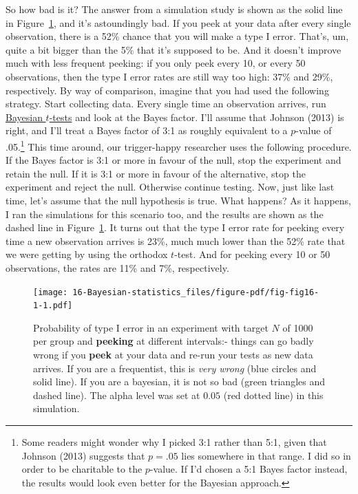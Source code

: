 \documentclass[
  a4paper,
]{book}
\begin{document}
So how bad is it? The answer from a simulation study is shown as the
solid line in Figure~\ref{fig-fig16-1}, and it's astoundingly bad. If
you peek at your data after every single observation, there is a 52\%
chance that you will make a type I error. That's, um, quite a bit bigger
than the 5\% that it's supposed to be. And it doesn't improve much with
less frequent peeking: if you only peek every 10, or every 50
observations, then the type I error rates are still way too high: 37\%
and 29\%, respectively. By way of comparison, imagine that you had used
the following strategy. Start collecting data. Every single time an
observation arrives, run \protect\hyperlink{bayesian-t-tests}{Bayesian
\(t\)-tests} and look at the Bayes factor. I'll assume that Johnson
(2013) is right, and I'll treat a Bayes factor of 3:1 as roughly
equivalent to a \(p\)-value of .05.\footnote{Some readers might wonder
  why I picked 3:1 rather than 5:1, given that Johnson (2013) suggests
  that \(p = .05\) lies somewhere in that range. I did so in order to be
  charitable to the \(p\)-value. If I'd chosen a 5:1 Bayes factor
  instead, the results would look even better for the Bayesian approach.}
This time around, our trigger-happy researcher uses the following
procedure. If the Bayes factor is 3:1 or more in favour of the null,
stop the experiment and retain the null. If it is 3:1 or more in favour
of the alternative, stop the experiment and reject the null. Otherwise
continue testing. Now, just like last time, let's assume that the null
hypothesis is true. What happens? As it happens, I ran the simulations
for this scenario too, and the results are shown as the dashed line in
Figure~\ref{fig-fig16-1}. It turns out that the type I error rate for
peeking every time a new observation arrives is 23\%, much much lower
than the 52\% rate that we were getting by using the orthodox
\(t\)-test. And for peeking every 10 or 50 observations, the rates are
11\% and 7\%, respectively.

\begin{figure}

\texttt{[image: 16-Bayesian-statistics\_files/figure-pdf/fig-fig16-1-1.pdf]} \hfill{}

\caption{\label{fig-fig16-1}Probability of type I error in an experiment
with target \(N\) of 1000 per group and \textbf{peeking} at different
intervals:- things can go badly wrong if you \textbf{peek} at your data
and re-run your tests as new data arrives. If you are a frequentist,
this is \emph{very wrong} (blue circles and solid line). If you are a
bayesian, it is not so bad (green triangles and dashed line). The alpha
level was set at \(0.05\) (red dotted line) in this simulation.}

\end{figure}
\end{document}
